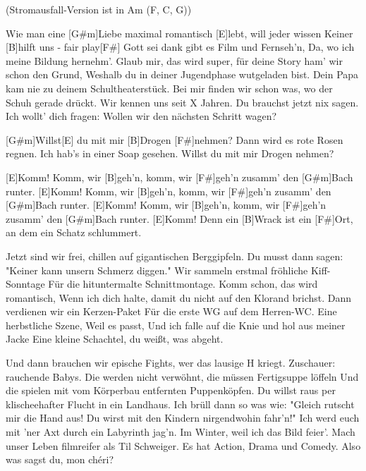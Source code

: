 
{\footnotesize (Stromausfall-Version ist in Am (F, C, G))}



\begin{guitar}
	
	Wie man eine [G#m]Liebe maximal romantisch [E]lebt, will jeder wissen
	Keiner [B]hilft uns - fair play[F#]{ }
	Gott sei dank gibt es Film und Fernseh'n,
	Da, wo ich meine Bildung hernehm'.
	Glaub mir, das wird super, für deine Story ham' wir schon den Grund,
	Weshalb du in deiner Jugendphase wutgeladen bist.
	Dein Papa kam nie zu deinem Schultheaterstück.
	Bei mir finden wir schon was, wo der Schuh gerade drückt.
	Wir kennen uns seit X Jahren.
	Du brauchst jetzt nix sagen.
	Ich wollt' dich fragen:
	Wollen wir den nächsten Schritt wagen?
	
	[G#m]Willst[E] du mit mir [B]Drogen [F#]nehmen?
	Dann wird es rote Rosen regnen.
	Ich hab’s in einer Soap gesehen.
	Willst du mit mir Drogen nehmen?
	
	[E]Komm! Komm, wir [B]geh'n, komm, wir [F#]geh'n zusamm' den [G#m]Bach runter.
	[E]Komm! Komm, wir [B]geh'n, komm, wir [F#]geh'n zusamm' den [G#m]Bach runter.
	[E]Komm! Komm, wir [B]geh'n, komm, wir [F#]geh'n zusamm' den [G#m]Bach runter.
	[E]Komm! Denn ein [B]Wrack ist ein [F#]Ort, an dem ein Schatz schlummert.
	
	\pagebreak
	
	Jetzt sind wir frei, chillen auf gigantischen Berggipfeln.
	Du musst dann sagen: "Keiner kann unsern Schmerz diggen."
	Wir sammeln erstmal fröhliche Kiff-Sonntage
	Für die hituntermalte Schnittmontage.
	Komm schon, das wird romantisch,
	Wenn ich dich halte, damit du nicht auf den Klorand brichst.
	Dann verdienen wir ein Kerzen-Paket
	Für die erste WG auf dem Herren-WC.
	Eine herbstliche Szene,
	Weil es passt,
	Und ich falle auf die Knie und hol aus meiner Jacke
	Eine kleine Schachtel, du weißt, was abgeht.
	
	 
	
	 
	
	Und dann brauchen wir epische Fights, wer das lausige H kriegt.
	Zuschauer: rauchende Babys.
	Die werden nicht verwöhnt, die müssen Fertigsuppe löffeln
	Und die spielen mit vom Körperbau entfernten Puppenköpfen.
	Du willst raus per klischeehafter Flucht in ein Landhaus.
	Ich brüll dann so was wie: "Gleich rutscht mir die Hand aus!
	Du wirst mit den Kindern nirgendwohin fahr'n!"
	Ich werd euch mit 'ner Axt durch ein Labyrinth jag’n.
	Im Winter, weil ich das Bild feier'.
	Mach unser Leben filmreifer als Til Schweiger.
	Es hat Action, Drama und Comedy.
	Also was sagst du, mon chéri?
	

\end{guitar}
